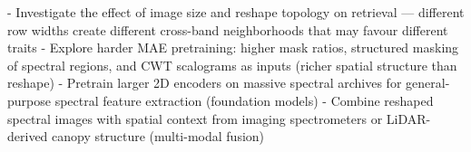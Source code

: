 
 - Investigate the effect of image size and reshape
   topology on retrieval --- different row widths create
   different cross-band neighborhoods that may favour
   different traits
 - Explore harder MAE pretraining: higher mask ratios,
   structured masking of spectral regions, and CWT
   scalograms as inputs (richer spatial structure than
   reshape)
 - Pretrain larger 2D encoders on massive spectral
   archives for general-purpose spectral feature
   extraction (foundation models)
 - Combine reshaped spectral images with spatial context
   from imaging spectrometers or LiDAR-derived canopy
   structure (multi-modal fusion)

